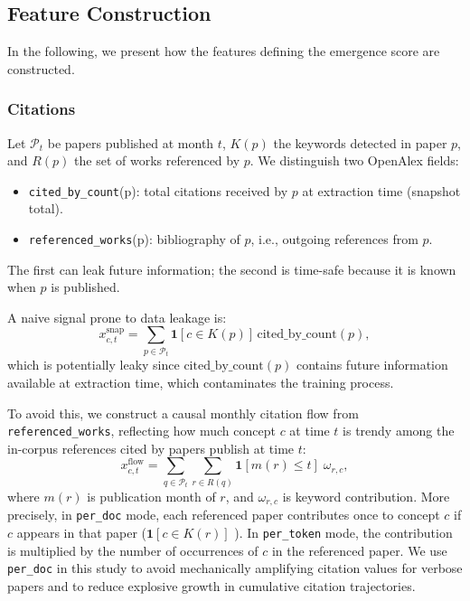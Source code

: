 \documentclass{article}
\begin{document}
\subsection{Feature Construction}
In the following, we present how the features defining the emergence score are constructed.
\subsubsection{Citations}

Let \(\mathcal{P}_t\) be papers published at month \(t\), \(K(p)\) the keywords detected in paper \(p\), and \(R(p)\) the set of works referenced by \(p\).
We distinguish two OpenAlex fields:
\begin{itemize}
    \item \texttt{cited\_by\_count}(p): total citations received by \(p\) at extraction time (snapshot total).
    \item \texttt{referenced\_works}(p): bibliography of \(p\), i.e., outgoing references from \(p\).
\end{itemize}
The first can leak future information; the second is time-safe because it is known when \(p\) is published.

A naive signal prone to data leakage is:
\[
x^{\mathrm{snap}}_{c,t}
=
\sum_{p \in \mathcal{P}_t}
\mathbf{1}[c \in K(p)] \,\mathrm{cited\_by\_count}(p),
\]
which is potentially leaky since \(\mathrm{cited\_by\_count}(p)\) contains future information available at extraction time, which contaminates the training process.

To avoid this, we construct a causal monthly citation flow from \texttt{referenced\_works}, reflecting how much concept \(c\) at time \(t\) is trendy among the in-corpus references cited by papers publish at time \(t\):
\[
x^{\mathrm{flow}}_{c,t}
=
\sum_{q \in \mathcal{P}_t}
\sum_{r \in R(q)}
\mathbf{1}[m(r)\le t]\;\omega_{r,c},
\]
where \(m(r)\) is publication month of \(r\), and \(\omega_{r,c}\) is keyword contribution.
More precisely, in \texttt{per\_doc} mode, each referenced paper contributes once to concept \(c\) if \(c\) appears in that paper (\(\mathbf{1}[c\in K(r)]\) ).
In \texttt{per\_token} mode, the contribution is multiplied by the number of occurrences of \(c\) in the referenced paper.
We use \texttt{per\_doc} in this study to avoid mechanically amplifying citation values for verbose papers and to reduce explosive growth in cumulative citation trajectories.
\end{document}
